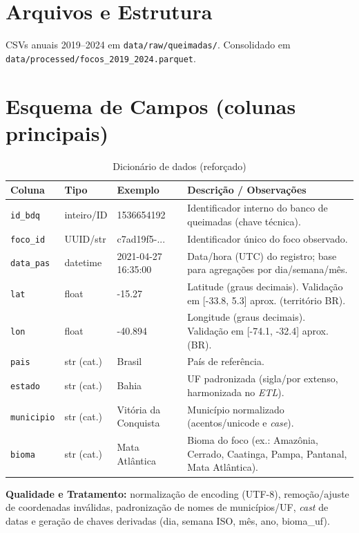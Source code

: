 \documentclass[12pt,a4paper]{report}
\begin{document}
\section{Arquivos e Estrutura}
CSVs anuais 2019--2024 em \texttt{data/raw/queimadas/}. Consolidado em \texttt{data/processed/focos\_2019\_2024.parquet}.

\section{Esquema de Campos (colunas principais)}
\begin{table}[h]
\centering
\caption{Dicionário de dados (reforçado)}
\label{tab:dicionario}
\begin{tabular}{p{3.2cm} p{3cm} p{3.5cm} p{6.5cm}}
\toprule
\textbf{Coluna} & \textbf{Tipo} & \textbf{Exemplo} & \textbf{Descrição / Observações}\\
\midrule
\texttt{id\_bdq} & inteiro/ID & 1536654192 & Identificador interno do banco de queimadas (chave técnica).\\
\texttt{foco\_id} & UUID/str & c7ad19f5-... & Identificador único do foco observado.\\
\texttt{data\_pas} & datetime & 2021-04-27 16:35:00 & Data/hora (UTC) do registro; base para agregações por dia/semana/mês.\\
\texttt{lat} & float & -15.27 & Latitude (graus decimais). Validação em [-33.8, 5.3] aprox. (território BR).\\
\texttt{lon} & float & -40.894 & Longitude (graus decimais). Validação em [-74.1, -32.4] aprox. (BR).\\
\texttt{pais} & str (cat.) & Brasil & País de referência.\\
\texttt{estado} & str (cat.) & Bahia & UF padronizada (sigla/por extenso, harmonizada no \textit{ETL}).\\
\texttt{municipio} & str (cat.) & Vitória da Conquista & Município normalizado (acentos/unicode e \textit{case}).\\
\texttt{bioma} & str (cat.) & Mata Atlântica & Bioma do foco (ex.: Amazônia, Cerrado, Caatinga, Pampa, Pantanal, Mata Atlântica).\\
\bottomrule
\end{tabular}
\end{table}

\noindent\textbf{Qualidade e Tratamento:} normalização de encoding (UTF-8), remoção/ajuste de coordenadas inválidas, padronização de nomes de municípios/UF, \textit{cast} de datas e geração de chaves derivadas (dia, semana ISO, mês, ano, bioma\_uf).
\end{document}

